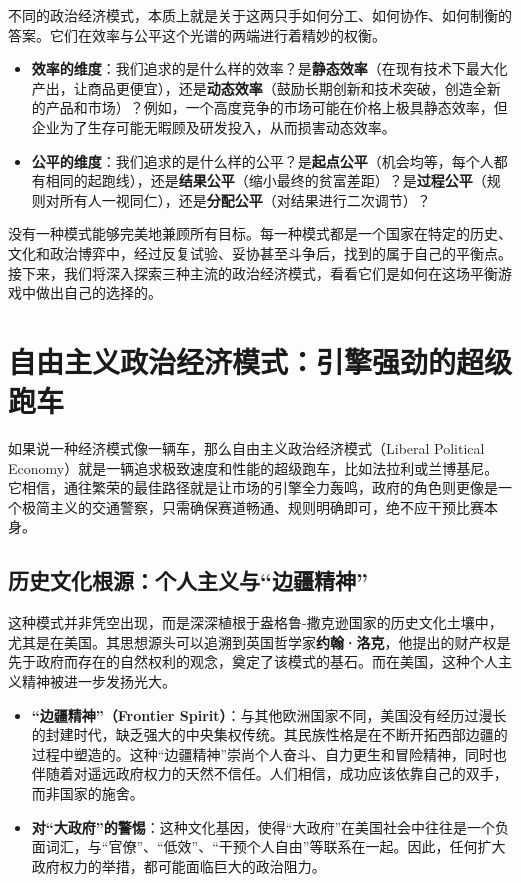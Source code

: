 不同的政治经济模式，本质上就是关于这两只手如何分工、如何协作、如何制衡的答案。它们在效率与公平这个光谱的两端进行着精妙的权衡。

\begin{itemize}
\item \textbf{效率的维度}：我们追求的是什么样的效率？是\textbf{静态效率}（在现有技术下最大化产出，让商品更便宜），还是\textbf{动态效率}（鼓励长期创新和技术突破，创造全新的产品和市场）？例如，一个高度竞争的市场可能在价格上极具静态效率，但企业为了生存可能无暇顾及研发投入，从而损害动态效率。
\item \textbf{公平的维度}：我们追求的是什么样的公平？是\textbf{起点公平}（机会均等，每个人都有相同的起跑线），还是\textbf{结果公平}（缩小最终的贫富差距）？是\textbf{过程公平}（规则对所有人一视同仁），还是\textbf{分配公平}（对结果进行二次调节）？
\end{itemize}

没有一种模式能够完美地兼顾所有目标。每一种模式都是一个国家在特定的历史、文化和政治博弈中，经过反复试验、妥协甚至斗争后，找到的属于自己的平衡点。接下来，我们将深入探索三种主流的政治经济模式，看看它们是如何在这场平衡游戏中做出自己的选择的。

\section{自由主义政治经济模式：引擎强劲的超级跑车}

如果说一种经济模式像一辆车，那么自由主义政治经济模式（Liberal Political Economy）就是一辆追求极致速度和性能的超级跑车，比如法拉利或兰博基尼。它相信，通往繁荣的最佳路径就是让市场的引擎全力轰鸣，政府的角色则更像是一个极简主义的交通警察，只需确保赛道畅通、规则明确即可，绝不应干预比赛本身。

\subsection{历史文化根源：个人主义与“边疆精神”}

这种模式并非凭空出现，而是深深植根于盎格鲁-撒克逊国家的历史文化土壤中，尤其是在美国。其思想源头可以追溯到英国哲学家\textbf{约翰·洛克}，他提出的财产权是先于政府而存在的自然权利的观念，奠定了该模式的基石。而在美国，这种个人主义精神被进一步发扬光大。

\begin{itemize}
\item \textbf{“边疆精神”（Frontier Spirit）}：与其他欧洲国家不同，美国没有经历过漫长的封建时代，缺乏强大的中央集权传统。其民族性格是在不断开拓西部边疆的过程中塑造的。这种“边疆精神”崇尚个人奋斗、自力更生和冒险精神，同时也伴随着对遥远政府权力的天然不信任。人们相信，成功应该依靠自己的双手，而非国家的施舍。
\item \textbf{对“大政府”的警惕}：这种文化基因，使得“大政府”在美国社会中往往是一个负面词汇，与“官僚”、“低效”、“干预个人自由”等联系在一起。因此，任何扩大政府权力的举措，都可能面临巨大的政治阻力。
\end{itemize}

